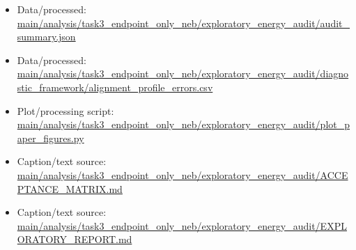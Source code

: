 \begin{itemize}[leftmargin=1.4em,noitemsep]
\item Data/processed: \begingroup\scriptsize\url{main/analysis/task3_endpoint_only_neb/exploratory_energy_audit/audit_summary.json}\endgroup
\item Data/processed: \begingroup\scriptsize\url{main/analysis/task3_endpoint_only_neb/exploratory_energy_audit/diagnostic_framework/alignment_profile_errors.csv}\endgroup
\item Plot/processing script: \begingroup\scriptsize\url{main/analysis/task3_endpoint_only_neb/exploratory_energy_audit/plot_paper_figures.py}\endgroup
\item Caption/text source: \begingroup\scriptsize\url{main/analysis/task3_endpoint_only_neb/exploratory_energy_audit/ACCEPTANCE_MATRIX.md}\endgroup
\item Caption/text source: \begingroup\scriptsize\url{main/analysis/task3_endpoint_only_neb/exploratory_energy_audit/EXPLORATORY_REPORT.md}\endgroup
\end{itemize}
